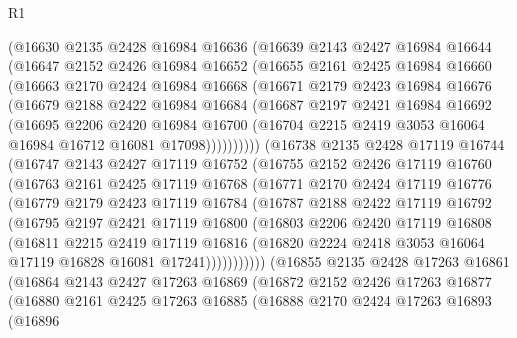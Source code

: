 \begin{lexlean}{R1}
\begin{coremodule}
    (@16630
      @2135
      @2428
      @16984
      @16636
      (@16639
        @2143
        @2427
        @16984
        @16644
        (@16647
          @2152
          @2426
          @16984
          @16652
          (@16655
            @2161
            @2425
            @16984
            @16660
            (@16663
              @2170
              @2424
              @16984
              @16668
              (@16671
                @2179
                @2423
                @16984
                @16676
                (@16679
                  @2188
                  @2422
                  @16984
                  @16684
                  (@16687
                    @2197
                    @2421
                    @16984
                    @16692
                    (@16695
                      @2206
                      @2420
                      @16984
                      @16700
                      (@16704 @2215 @2419 @3053 @16064 @16984 @16712 @16081 @17098))))))))))
    (@16738
      @2135
      @2428
      @17119
      @16744
      (@16747
        @2143
        @2427
        @17119
        @16752
        (@16755
          @2152
          @2426
          @17119
          @16760
          (@16763
            @2161
            @2425
            @17119
            @16768
            (@16771
              @2170
              @2424
              @17119
              @16776
              (@16779
                @2179
                @2423
                @17119
                @16784
                (@16787
                  @2188
                  @2422
                  @17119
                  @16792
                  (@16795
                    @2197
                    @2421
                    @17119
                    @16800
                    (@16803
                      @2206
                      @2420
                      @17119
                      @16808
                      (@16811
                        @2215
                        @2419
                        @17119
                        @16816
                        (@16820 @2224 @2418 @3053 @16064 @17119 @16828 @16081 @17241)))))))))))
    (@16855
      @2135
      @2428
      @17263
      @16861
      (@16864
        @2143
        @2427
        @17263
        @16869
        (@16872
          @2152
          @2426
          @17263
          @16877
          (@16880
            @2161
            @2425
            @17263
            @16885
            (@16888
              @2170
              @2424
              @17263
              @16893
              (@16896

\end{coremodule}
\end{lexlean}
